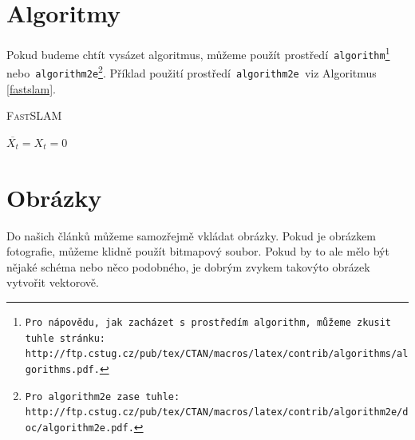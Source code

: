 \documentclass[a4paper, 11pt]{article}
\begin{document}
\bigskip

\pagebreak

\section{Algoritmy}
\label{algoritmy}
Pokud budeme chtít vysázet algoritmus, můžeme použít prostředí\texttt{ algorithm\footnote{
	Pro nápovědu, jak zacházet s prostředím\texttt{ algorithm,} můžeme zkusit tuhle stránku: \\
	http://ftp.cstug.cz/pub/tex/CTAN/macros/latex/contrib/algorithms/algorithms.pdf.}}
nebo\texttt{ algorithm2e\footnote{
	Pro\texttt{ algorithm2e }zase tuhle:
	http://ftp.cstug.cz/pub/tex/CTAN/macros/latex/contrib/algorithm2e/doc/algorithm2e.pdf.
}}. Příklad použití prostředí\texttt{ algorithm2e }viz Algoritmus \ref{fastslam}.


\IncMargin{1.5em}
	\begin{algorithm}
		\caption{\textsc{FastSLAM}}
		\label{fastslam}

		\SetNlSty{}{}{:}
		\SetNlSkip{0.4em}
		\SetInd{1em}{1em}

		\Indm\Indmm
		\Indp\Indpp
		\BlankLine

		$ \overline{X_t} = X_t = 0 $ \\



	\end{algorithm}
\DecMargin{1.5em}

\section{Obrázky}
Do našich článků můžeme samozřejmě vkládat obrázky. Pokud je obrázkem fotografie, můžeme klidně použít bitmapový soubor. Pokud by to ale mělo být nějaké schéma nebo něco podobného, je dobrým zvykem takovýto obrázek vytvořit vektorově.
\end{document}
